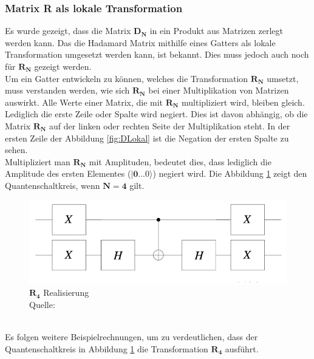 \subsubsection{Matrix R als lokale Transformation}
Es wurde gezeigt, dass die Matrix $\mathbf{D_N}$ in ein Produkt aus Matrizen zerlegt werden kann. Das die Hadamard Matrix mithilfe eines Gatters als lokale Transformation umgesetzt werden kann, ist bekannt. Dies muss jedoch auch noch für $\mathbf{R_N}$ gezeigt werden. 
\\
Um ein Gatter entwickeln zu können, welches die Transformation $\mathbf{R_N}$ umsetzt, muss verstanden werden, wie sich $\mathbf{R_N}$ bei einer Multiplikation von Matrizen auswirkt. Alle Werte einer Matrix, die mit $\mathbf{R_N}$ multipliziert wird, bleiben gleich. Lediglich die erste Zeile oder Spalte wird negiert. Dies ist davon abhängig, ob die Matrix $\mathbf{R_N}$ auf der linken oder rechten Seite der Multiplikation steht. In der ersten Zeile der Abbildung \ref{fig:DLokal} ist die Negation der ersten Spalte zu sehen.
\\
Multipliziert man $\mathbf{R_N}$ mit Amplituden, bedeutet dies, dass lediglich die Amplitude des ersten Elementes ($\mathbf{|0...0\rangle}$) negiert wird.
Die Abbildung \ref{fig:Rgatter} zeigt den Quantenschaltkreis, wenn $\mathbf{N = 4}$ gilt.
\begin{figure}[hbtp]
	\centering
	\includegraphics[width=.8\textwidth]{figures/rgatter.png}
	\caption{$\mathbf{R_4}$ Realisierung \\ Quelle: \cite[S. 145]{Ho17}}
	\label{fig:Rgatter}
\end{figure}
\\
Es folgen weitere Beispielrechnungen, um zu verdeutlichen, dass der Quantenschaltkreis in Abbildung \ref{fig:Rgatter} die Transformation $\mathbf{R_4}$ ausführt.
